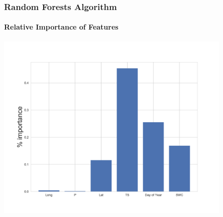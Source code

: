 \documentclass{beamer}
\begin{document}
\begin{frame}
\frametitle{Random Forests Algorithm}
\framesubtitle{Relative Importance of Features}
\centering
\includegraphics[width=0.85\textwidth]{importance.png}\\
\end{frame}




\end{document}
